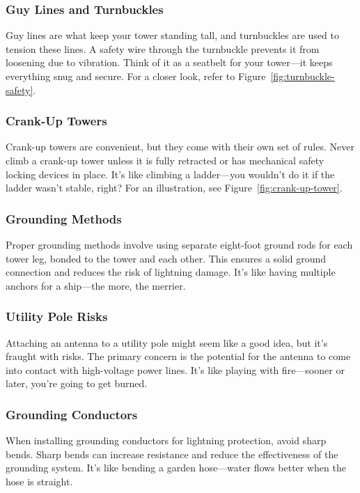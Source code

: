 \subsubsection*{Guy Lines and Turnbuckles}
Guy lines are what keep your tower standing tall, and turnbuckles are used to tension these lines. A safety wire through the turnbuckle prevents it from loosening due to vibration. Think of it as a seatbelt for your tower—it keeps everything snug and secure. For a closer look, refer to Figure~\ref{fig:turnbuckle-safety}.

\subsubsection*{Crank-Up Towers}
Crank-up towers are convenient, but they come with their own set of rules. Never climb a crank-up tower unless it is fully retracted or has mechanical safety locking devices in place. It’s like climbing a ladder—you wouldn’t do it if the ladder wasn’t stable, right? For an illustration, see Figure~\ref{fig:crank-up-tower}.

\subsubsection*{Grounding Methods}
Proper grounding methods involve using separate eight-foot ground rods for each tower leg, bonded to the tower and each other. This ensures a solid ground connection and reduces the risk of lightning damage. It’s like having multiple anchors for a ship—the more, the merrier.

\subsubsection*{Utility Pole Risks}
Attaching an antenna to a utility pole might seem like a good idea, but it’s fraught with risks. The primary concern is the potential for the antenna to come into contact with high-voltage power lines. It’s like playing with fire—sooner or later, you’re going to get burned.

\subsubsection*{Grounding Conductors}
When installing grounding conductors for lightning protection, avoid sharp bends. Sharp bends can increase resistance and reduce the effectiveness of the grounding system. It’s like bending a garden hose—water flows better when the hose is straight.

